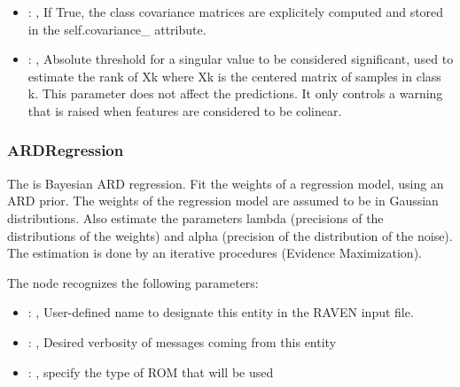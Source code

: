 \begin{itemize}
    \item {}: , 
      If True, the class covariance matrices are explicitely
      computed and stored in the self.covariance\_ attribute.

    \item {}: , 
      Absolute threshold for a singular value to be considered
      significant, used to estimate the rank of Xk where Xk is the centered
      matrix of samples in class k. This parameter does not affect
      the predictions. It only controls a warning that is raised when
      features are considered to be colinear.
  \end{itemize}


\subsubsection{ARDRegression}
  The  is Bayesian ARD regression.                             Fit the
  weights of a regression model, using an ARD prior. The weights of the
  regression model are assumed to be in Gaussian distributions. Also estimate the
  parameters lambda (precisions of the distributions of the weights) and
  alpha (precision of the distribution of the noise).                             The estimation is
  done by an iterative procedures (Evidence Maximization).

  The  node recognizes the following parameters:
    \begin{itemize}
      \item {}: , 
        User-defined name to designate this entity in the RAVEN input file.
      \item {}: , 
        Desired verbosity of messages coming from this entity
      \item {}: , 
        specify the type of ROM that will be used
  \end{itemize}

